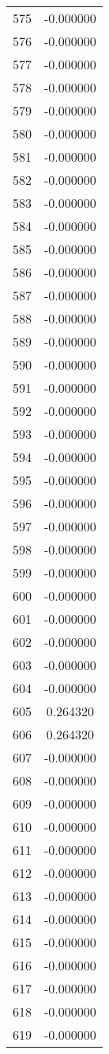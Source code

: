 \documentclass[12pt]{article}
\begin{document}
\begin{longtable}{@{}cc@{}}
575 & -0.000000 \\
576 & -0.000000 \\
577 & -0.000000 \\
578 & -0.000000 \\
579 & -0.000000 \\
580 & -0.000000 \\
581 & -0.000000 \\
582 & -0.000000 \\
583 & -0.000000 \\
584 & -0.000000 \\
585 & -0.000000 \\
586 & -0.000000 \\
587 & -0.000000 \\
588 & -0.000000 \\
589 & -0.000000 \\
590 & -0.000000 \\
591 & -0.000000 \\
592 & -0.000000 \\
593 & -0.000000 \\
594 & -0.000000 \\
595 & -0.000000 \\
596 & -0.000000 \\
597 & -0.000000 \\
598 & -0.000000 \\
599 & -0.000000 \\
600 & -0.000000 \\
601 & -0.000000 \\
602 & -0.000000 \\
603 & -0.000000 \\
604 & -0.000000 \\
605 & 0.264320 \\
606 & 0.264320 \\
607 & -0.000000 \\
608 & -0.000000 \\
609 & -0.000000 \\
610 & -0.000000 \\
611 & -0.000000 \\
612 & -0.000000 \\
613 & -0.000000 \\
614 & -0.000000 \\
615 & -0.000000 \\
616 & -0.000000 \\
617 & -0.000000 \\
618 & -0.000000 \\
619 & -0.000000 \\

\end{longtable}
\end{document}
